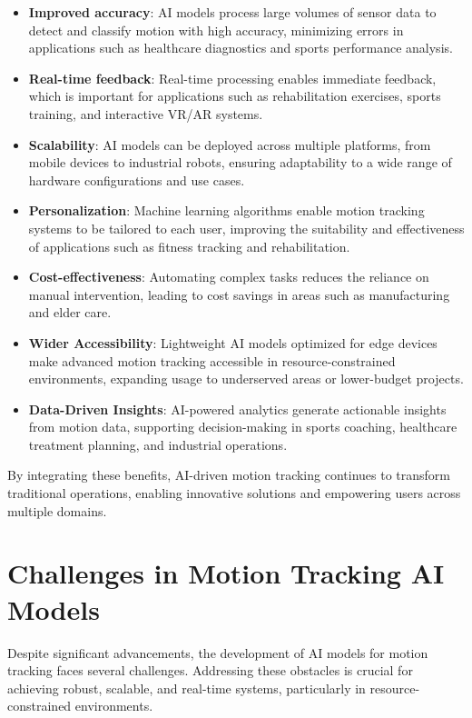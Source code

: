 \begin{itemize}
\item \textbf{Improved accuracy}: AI models process large volumes of sensor data to detect and classify motion with high accuracy, minimizing errors in applications such as healthcare diagnostics and sports performance analysis.

\item \textbf{Real-time feedback}: Real-time processing enables immediate feedback, which is important for applications such as rehabilitation exercises, sports training, and interactive VR/AR systems.

\item \textbf{Scalability}: AI models can be deployed across multiple platforms, from mobile devices to industrial robots, ensuring adaptability to a wide range of hardware configurations and use cases.

\item \textbf{Personalization}: Machine learning algorithms enable motion tracking systems to be tailored to each user, improving the suitability and effectiveness of applications such as fitness tracking and rehabilitation.

\item \textbf{Cost-effectiveness}: Automating complex tasks reduces the reliance on manual intervention, leading to cost savings in areas such as manufacturing and elder care.

\item \textbf{Wider Accessibility}: Lightweight AI models optimized for edge devices make advanced motion tracking accessible in resource-constrained environments, expanding usage to underserved areas or lower-budget projects.

\item \textbf{Data-Driven Insights}: AI-powered analytics generate actionable insights from motion data, supporting decision-making in sports coaching, healthcare treatment planning, and industrial operations.

\end{itemize}

By integrating these benefits, AI-driven motion tracking continues to transform traditional operations, enabling innovative solutions and empowering users across multiple domains.


\section{Challenges in Motion Tracking AI Models}
Despite significant advancements, the development of AI models for motion tracking faces several challenges. Addressing these obstacles is crucial for achieving robust, scalable, and real-time systems, particularly in resource-constrained environments.

